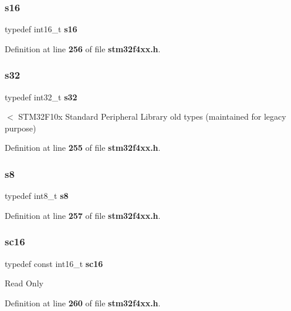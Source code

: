 \subsubsection{s16}
{\footnotesize\ttfamily typedef int16\+\_\+t \textbf{ s16}}



Definition at line \textbf{ 256} of file \textbf{ stm32f4xx.\+h}.

\mbox{\label{group__Exported__types_gae9b1af5c037e57a98884758875d3a7c4}} 
\subsubsection{s32}
{\footnotesize\ttfamily typedef int32\+\_\+t \textbf{ s32}}

$<$ S\+T\+M32\+F10x Standard Peripheral Library old types (maintained for legacy purpose) 

Definition at line \textbf{ 255} of file \textbf{ stm32f4xx.\+h}.

\mbox{\label{group__Exported__types_ga9e382f207c65ca13ab4ae98363aeda80}} 
\subsubsection{s8}
{\footnotesize\ttfamily typedef int8\+\_\+t \textbf{ s8}}



Definition at line \textbf{ 257} of file \textbf{ stm32f4xx.\+h}.

\mbox{\label{group__Exported__types_ga66ab742a0751bb4e7661b8e874f2ddda}} 
\subsubsection{sc16}
{\footnotesize\ttfamily typedef const int16\+\_\+t \textbf{ sc16}}

Read Only 

Definition at line \textbf{ 260} of file \textbf{ stm32f4xx.\+h}.

\mbox{\label{group__Exported__types_gad97679599f3791409523fdb1c6156a28}} 
